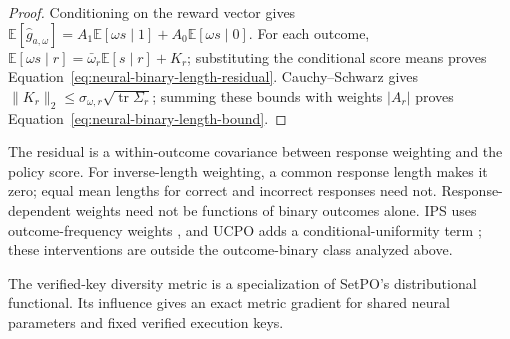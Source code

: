\documentclass{article}
\newcommand{\enforcehalffinalproseline}{%
  \setlength{\parfillskip}{0pt plus .20\linewidth}}
\newcommand{\1}{\mathbf 1}
\newcommand{\E}{\mathbb E}
\theoremstyle{remark}
\theoremstyle{definition}
\theoremstyle{plain}
\begin{document}
\begin{proof}
\enforcehalffinalproseline
Conditioning on the reward vector gives
$\E[\widehat g_{a,\omega}]
=A_1\E[\omega s\mid1]+A_0\E[\omega s\mid0]$.
For each outcome, $\E[\omega s\mid r]
=\bar\omega_r\E[s\mid r]+K_r$; substituting the conditional score
means proves Equation~\eqref{eq:neural-binary-length-residual}.
Cauchy--Schwarz gives
$\|K_r\|_2\le\sigma_{\omega,r}\sqrt{\operatorname{tr}\Sigma_r}$;
summing these bounds with weights $|A_r|$ proves
Equation~\eqref{eq:neural-binary-length-bound}.
\end{proof}

The residual is a within-outcome covariance between response weighting and
the policy score. For inverse-length weighting, a common response length
makes it zero; equal mean lengths for correct and incorrect responses need
not. Response-dependent weights need not be functions of binary outcomes
alone. IPS uses outcome-frequency weights
\citep[Section~4.4, v1]{sinha2026expected}, and UCPO adds a
conditional-uniformity term \citep[Section~6, v1]{lochab2026ucpo}; these
interventions are outside the outcome-binary class analyzed above.

The verified-key diversity metric is a specialization of SetPO's
distributional functional. Its influence gives an exact metric gradient
for shared neural parameters and fixed verified execution keys.
\end{document}
